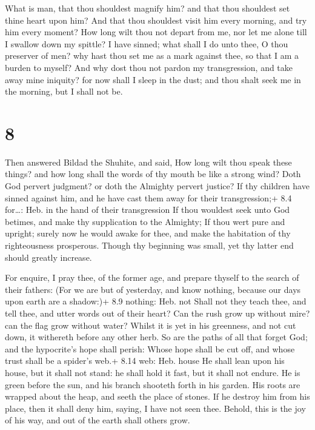  What is man, that thou shouldest magnify him? and that
thou shouldest set thine heart upon him?  And that thou
shouldest visit him every morning, and try him every moment?
 How long wilt thou not depart from me, nor let me alone
till I swallow down my spittle?  I have sinned; what shall
I do unto thee, O thou preserver of men? why hast thou set me as a mark
against thee, so that I am a burden to myself?  And why
dost thou not pardon my transgression, and take away mine iniquity? for
now shall I sleep in the dust; and thou shalt seek me in the morning,
but I shall not be.

\hypertarget{section-7}{%
\section{8}\label{section-7}}

 Then answered Bildad the Shuhite, and said, 
How long wilt thou speak these things? and how long shall the words of
thy mouth be like a strong wind?  Doth God pervert judgment?
or doth the Almighty pervert justice?  If thy children have
sinned against him, and he have cast them away for their transgression;+
8.4 for\ldots: Heb. in the hand of their transgression  If
thou wouldest seek unto God betimes, and make thy supplication to the
Almighty;  If thou wert pure and upright; surely now he
would awake for thee, and make the habitation of thy righteousness
prosperous.  Though thy beginning was small, yet thy latter
end should greatly increase.

 For enquire, I pray thee, of the former age, and prepare
thyself to the search of their fathers:  (For we are but of
yesterday, and know nothing, because our days upon earth are a shadow:)+
8.9 nothing: Heb. not  Shall not they teach thee, and tell
thee, and utter words out of their heart?  Can the rush
grow up without mire? can the flag grow without water? 
Whilst it is yet in his greenness, and not cut down, it withereth before
any other herb.  So are the paths of all that forget God;
and the hypocrite's hope shall perish:  Whose hope shall be
cut off, and whose trust shall be a spider's web.+ 8.14 web: Heb. house
 He shall lean upon his house, but it shall not stand: he
shall hold it fast, but it shall not endure.  He is green
before the sun, and his branch shooteth forth in his garden.
 His roots are wrapped about the heap, and seeth the place
of stones.  If he destroy him from his place, then it shall
deny him, saying, I have not seen thee.  Behold, this is
the joy of his way, and out of the earth shall others grow.

